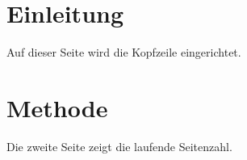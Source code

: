 \documentclass[headsepline=true]{scrartcl}
\begin{document}
\section{Einleitung}
Auf dieser Seite wird die Kopfzeile eingerichtet.
\newpage
\section{Methode}
Die zweite Seite zeigt die laufende Seitenzahl.
\end{document}
